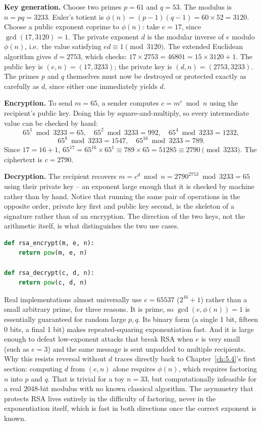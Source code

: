 \begin{example}
\textbf{Key generation.} Choose two primes $p = 61$ and $q = 53$. The modulus is
$n = pq = 3233$. Euler's totient is $\phi(n) = (p-1)(q-1) = 60 \times 52 = 3120$. Choose a public
exponent coprime to $\phi(n)$: take $e = 17$, since $\gcd(17, 3120) = 1$. The private exponent $d$ is
the modular inverse of $e$ modulo $\phi(n)$, i.e.\ the value satisfying $ed \equiv 1 \pmod{3120}$.
The extended Euclidean algorithm gives $d = 2753$, which checks: $17 \times 2753 = 46801 = 15 \times
3120 + 1$. The public key is $(e,n) = (17, 3233)$; the private key is $(d,n) = (2753, 3233)$. The
primes $p$ and $q$ themselves must now be destroyed or protected exactly as carefully as $d$, since
either one immediately yields $d$.

\textbf{Encryption.} To send $m = 65$, a sender computes $c = m^e \bmod n$ using the recipient's
public key. Doing this by square-and-multiply, so every intermediate value can be checked by hand:
\[
65^1 \bmod 3233 = 65, \quad 65^2 \bmod 3233 = 992, \quad 65^4 \bmod 3233 = 1232,
\]
\[
65^8 \bmod 3233 = 1547, \quad 65^{16} \bmod 3233 = 789.
\]
Since $17 = 16 + 1$, $65^{17} = 65^{16} \times 65^1 \equiv 789 \times 65 = 51285 \equiv 2790
\pmod{3233}$. The ciphertext is $c = 2790$.

\textbf{Decryption.} The recipient recovers $m = c^d \bmod n = 2790^{2753} \bmod 3233 = 65$ using
their private key -- an exponent large enough that it is checked by machine rather than by hand.
Notice that running the same pair of operations in the opposite order, private key first and public
key second, is the skeleton of a signature rather than of an encryption. The direction of the two
keys, not the arithmetic itself, is what distinguishes the two use cases.
\end{example}

\begin{lstlisting}[language=Python, caption={RSA encryption and decryption via modular exponentiation}]
def rsa_encrypt(m, e, n):
    return pow(m, e, n)

def rsa_decrypt(c, d, n):
    return pow(c, d, n)
\end{lstlisting}

Real implementations almost universally use $e = 65537$ ($2^{16}+1$) rather than a small arbitrary
prime, for three reasons. It is prime, so $\gcd(e, \phi(n)) = 1$ is essentially guaranteed for random
large $p, q$. Its binary form (a single 1 bit, fifteen 0 bits, a final 1 bit) makes repeated-squaring
exponentiation fast. And it is large enough to defeat low-exponent attacks that break RSA when $e$ is
very small (such as $e=3$) and the same message is sent unpadded to multiple recipients. Why this
resists reversal without $d$ traces directly back to Chapter~\ref{ch:5.4}'s first section: computing
$d$ from $(e, n)$ alone requires $\phi(n)$, which requires factoring $n$ into $p$ and $q$. That is
trivial for a toy $n=33$, but computationally infeasible for a real 2048-bit modulus with no known
classical algorithm. The asymmetry that protects RSA lives entirely in the difficulty of factoring,
never in the exponentiation itself, which is fast in both directions once the correct exponent is
known.

